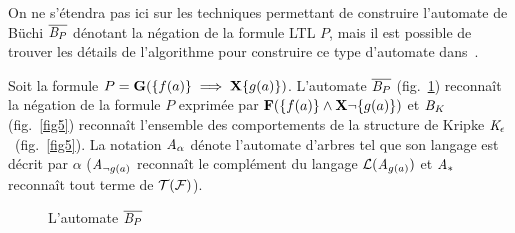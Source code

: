 On ne s'étendra pas ici sur les techniques permettant de construire l'automate de Büchi $\overline{\mathit B_P}$ dénotant
la négation de la formule LTL $P$, mais il est possible de trouver les détails de l'algorithme pour construire ce type
d'automate dans~\cite{DBLP:conf/pstv/GerthPVW95}.
\begin{example}
  Soit la formule $P = \mathbf G(\{f(a)\} \; \Longrightarrow \; \mathbf X \{g(a)\})$.
  L'automate $\overline{\mathit B_P}$ (fig.~\ref{fig4}) reconnaît la négation de la formule $P$
  exprimée par $\mathbf F(\{f(a)\} \land \mathbf X \neg\{g(a)\})$ et $\mathit B_\mathit K$ (fig.~\ref{fig5}) 
  reconnaît l'ensemble des comportements de la  structure de Kripke
  $\mathit K_\epsilon$~(fig.~\ref{fig5}). La notation $\mathit A_\alpha$ dénote l'automate d'arbres tel que son langage est décrit par $\alpha$
  ($\mathit A_{\neg g(a)}$ reconnaît le complément du langage $\mathcal{L}{}(\mathit A_{g(a)})$ et $\mathit A_*$ reconnaît tout terme de $\mathcal{T(F)}$).
  \begin{figure}[ht!]
    \centering
    \caption{\footnotesize L'automate $\overline{\mathit B_P}$}
    \label{fig4}  
  \end{figure}
\end{example}


